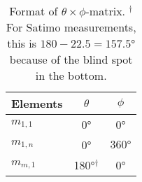 \begin{table}[htbp]
    \centering
    \begin{tabular}{|l|c|c|}
        \hline
        Elements & $\theta$ & $\phi$ \\
        \hline
        $m_{1,1}$ & \ang{0} & \ang{0} \\
        $m_{1,n}$ & \ang{0} & $\ang{360}$ \\
        $m_{m,1}$ & \ang{180}$^{\dagger}$ & \ang{0} \\
        \hline
    \end{tabular}
    \caption{Format of $\theta\times\phi$-matrix. $^{\dagger}$For Satimo measurements, this is $180-22.5=\ang{157.5}$ because of the blind spot in the bottom.}
    \label{tab:matrixformat}
\end{table}


